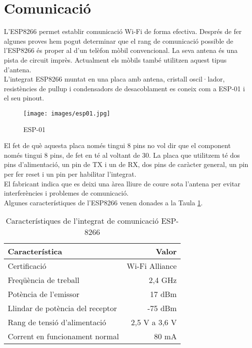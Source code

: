 \section{Comunicació}
L'ESP8266 permet establir comunicació Wi-Fi de forma efectiva. Després de fer algunes proves hem pogut determinar que el rang de comunicació possible de l'ESP8266 és proper al d'un telèfon mòbil convencional. La seva antena és una pista de circuit imprès. Actualment els mòbils també utilitzen aquest tipus d'antena.\\
\newline L'integrat ESP8266 muntat en una placa amb antena, cristall oscil·lador, resistències de pullup i condensadors de desacoblament es coneix com a ESP-01 i el seu pinout.
\begin{figure}[H]
\begin{center}
\texttt{[image: images/esp01.jpg]}
\end{center}
\caption{ESP-01}
\label{fig:ledring}
\end{figure}
%
\noindent El fet de què aquesta placa només tingui 8 pins no vol dir que el component només tingui 8 pins, de fet en té al voltant de 30. La placa que utilitzem té dos pins d'alimentació, un pin de TX i un de RX, dos pins de caràcter general, un pin per fer reset i un pin per habilitar l'integrat.\\
\newline El fabricant indica que es deixi una àrea lliure de coure sota l'antena per evitar interferències i problemes de comunicació.\\
\newline Algunes característiques de l'ESP8266 venen donades a la Taula \ref{tab:ESP8266}.
\begin{table}[H]
\small
\begin{center}
 \begin{tabular} {|l|r|}%
 \hline
 Característica & Valor \\
 \hline \hline 
Certificació & Wi-Fi Alliance \\ \hline
Freqüència de treball & 2,4 GHz \\ \hline
Potència de l'emissor & 17 dBm \\ \hline
Llindar de potència del receptor & -75 dBm \\ \hline
Rang de tensió d'alimentació & 2,5 V a 3,6 V \\ \hline
Corrent en funcionament normal & 80 mA \\ \hline

 \end{tabular}
 \caption{Característiques de l'integrat de comunicació ESP-8266}
 \label{tab:ESP8266}
\end{center}
\end{table}

